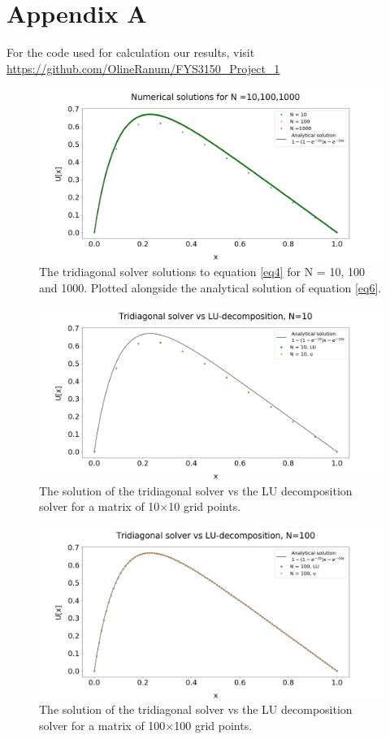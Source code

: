 \documentclass[%
reprint,
amsmath,amssymb,
aps,
]{revtex4-1}
\begin{document}
\section*{Appendix A}
For the code used for calculation our results, visit
\url{https://github.com/OlineRanum/FYS3150_Project_1}


\begin{figure}
	\includegraphics[width=\textwidth]{Numerical_solutions.png}
	\caption{The tridiagonal solver solutions to equation \ref{eq4} for N = 10, 100 and 1000. Plotted alongside the analytical solution of equation \ref{eq6}. }
	\label{fig:1}
\end{figure}

\begin{figure}
	\includegraphics[width=\textwidth]{N_LU_10.png}
	\caption{The solution of the tridiagonal solver vs the LU decomposition solver for a matrix of 10$\times$10 grid points. }
	\label{N10}
\end{figure}

\begin{figure}
	\includegraphics[width=\textwidth]{N_LU_100.png}
	\caption{The solution of the tridiagonal solver vs the LU decomposition solver for a matrix of 100$\times$100 grid points.}
	\label{N100}
\end{figure}
\end{document}
